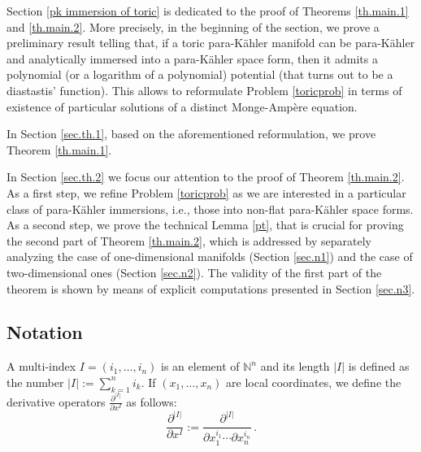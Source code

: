 \documentclass[11pt, reqno]{amsart}
\newcommand{\de}{\partial}
\newcommand{\N}{\mathds{N}}
\newcommand{\pk }{para-K\"{a}hler }
\newcommand{\I}{\mathcal{I}}
\begin{document}
\noindent
Section \ref{pk immersion of toric} is dedicated to the proof of Theorems \ref{th.main.1} and \ref{th.main.2}. More precisely, in the beginning of the section, we prove a preliminary result telling that, if a toric \pk manifold can be \pk and analytically immersed into a \pk space form, then it admits a  polynomial (or a logarithm of a polynomial) potential (that turns out to be a diastastis' function). This allows to reformulate Problem \ref{toricprob} in terms of existence of particular solutions of a distinct Monge-Ampère equation.

\noindent
In Section \ref{sec.th.1}, based on the aforementioned reformulation, we prove Theorem \ref{th.main.1}.


\noindent
In Section \ref{sec.th.2} we focus our attention to the proof of Theorem \ref{th.main.2}. As a first step, we refine  Problem \ref{toricprob} as we are interested in a particular class of \pk immersions, i.e., those into non-flat \pk space forms. As a second step, we prove the technical Lemma \ref{pt}, that is crucial for proving the second part of Theorem \ref{th.main.2}, which is addressed by separately analyzing the case of one-dimensional manifolds (Section \ref{sec.n1}) and the case of two-dimensional ones (Section \ref{sec.n2}). The validity of the first part of the theorem is shown by means of  explicit computations presented in Section \ref{sec.n3}.



\subsection*{Notation}
A multi-index $I=(i_1,\dots,i_n)$ is an element of $\N^n$ and its length $|I|$ is defined as the number $|I|:=\sum_{k=1}^ni_k$.  If $(x_1,\dots,x_n)$ are local coordinates, we define the
derivative operators $\frac{\de^{|I|}}{\de x^I}$ as follows:
$$
\frac{\de^{|I|}}{\de x^I}:=\frac{\de^{|I|}}{\de x_1^{i_1}\cdots \de x_n^{i_n}}\,.
$$
\end{document}
